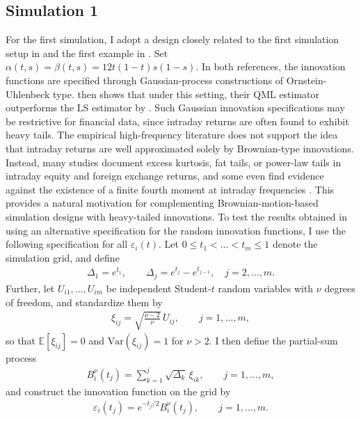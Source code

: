 \documentclass[12pt,a4paper]{article}
\theoremstyle{definition}
\begin{document}
\subsection{Simulation 1}
\label{subsec:Simulation1}
For the first simulation, I adopt a design closely related to the first simulation setup in \citet{Aue2017} and the first example in \citet{Cerovecki2019}. Set $\alpha(t,s)=\beta(t,s)=12t(1-t)s(1-s)$. In both references, the innovation functions are specified through Gaussian-process constructions of Ornstein-Uhlenbeck type. \citet{Cerovecki2019} then shows that under this setting, their QML estimator outperforms the LS estimator by \citeauthor{Aue2017}. Such Gaussian innovation specifications may be restrictive for financial data, since intraday returns are often found to exhibit heavy tails. The empirical high-frequency literature does not support the idea that intraday returns are well approximated solely by Brownian-type innovations. Instead, many studies document excess kurtosis, fat tails, or power-law tails in intraday equity and foreign exchange returns, and some even find evidence against the existence of a finite fourth moment at intraday frequencies \citep{LORETAN1994211,gopikrishnan1999scaling,plerou1999scaling,Superkurtosis}. This provides a natural motivation for complementing Brownian-motion-based simulation designs with heavy-tailed innovations. To test the results obtained in \citet{Cerovecki2019} using an alternative specification for the random innovation functions, I use the following specification for all $\varepsilon_i(t)$. 
Let \(0 \le t_1 < \dots < t_m \le 1\) denote the simulation grid, and define
\begin{gather}
\Delta_1 = e^{t_1}, 
\qquad 
\Delta_j = e^{t_j}-e^{t_{j-1}}, \quad j=2,\dots,m.
\end{gather}
Further, let \(U_{i1},\dots,U_{im}\) be independent Student-\(t\) random variables with \(\nu\) degrees of freedom, and standardize them by
\begin{gather}
\xi_{ij} = \sqrt{\frac{\nu-2}{\nu}}\,U_{ij},
\qquad j=1,\dots,m,
\end{gather}
so that \(\mathbb{E}[\xi_{ij}]=0\) and \(\mathrm{Var}(\xi_{ij})=1\) for \(\nu>2\). I then define the partial-sum process
\begin{gather}
B_i^\nu(t_j)=\sum_{k=1}^j \sqrt{\Delta_k}\,\xi_{ik},
\qquad j=1,\dots,m,
\end{gather}
and construct the innovation function on the grid by
\begin{gather}
\varepsilon_i(t_j)=e^{-t_j/2} B_i^\nu(t_j),
\qquad j=1,\dots,m.
\end{gather}
\end{document}
